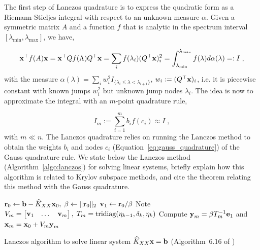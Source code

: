 \documentclass{article}
\begin{document}
The first step of Lanczos quadrature is to express the quadratic form as a Riemann-Stieljes integral with respect to an unknown measure $\alpha$. Given a symmetric matrix $A$ and a function $f$ that is analytic in the spectrum interval $[\lambda_{\min}, \lambda_{\max}]$, we have,

\begin{equation*}
    \boldsymbol{\mathbf{x}}^\top f(A) \boldsymbol{\mathbf{x}} = \boldsymbol{\mathbf{x}}^\top Q f(\Lambda) Q^\top \boldsymbol{\mathbf{x}} = \sum_i f(\lambda_i) (Q^\top \boldsymbol{\mathbf{x}})_i^2 = \int_{\lambda_{\min}}^{\lambda_{\max}} f(\lambda) d \alpha(\lambda) =: I \; ,
\end{equation*}
%
with the measure $\alpha(\lambda) = \sum_i w_i^2 I_{\{\lambda_i \le \lambda < \lambda_{i+1}\}}$, $w_i := (Q^\top \boldsymbol{\mathbf{x}})_i$, i.e. it is piecewise constant with known jumps $w_i^2$ but unknown jump nodes $\lambda_i$. The idea is now to approximate the integral with an $m$-point quadrature rule,

\begin{equation} \label{eq:gauss_quadrature}
    I_m := \sum_{i=1}^m b_i f(c_i) \approx I \; ,
\end{equation}
%
with $m \ll n$. The Lanczos quadrature relies on running the Lanczos method to obtain the weights $b_i$ and nodes $c_i$ (Equation~\eqref{eq:gauss_quadrature}) of the Gauss quadrature rule. We state below the Lanczos method (Algorithm~\ref{algo:lanczos}) for solving linear systems, briefly explain how this algorithm is related to Krylov subspace methods, and cite the theorem relating this method with the Gauss quadrature.

\begin{algorithm}[H]
 \label{algo:lanczos}
\SetAlgoLined
{}
\DontPrintSemicolon
{}
 $\boldsymbol{\mathbf{r}}_0 \leftarrow \boldsymbol{\mathbf{b}} - \widehat K_{XX} \boldsymbol{\mathbf{x}}_0, \; \beta \leftarrow \Vert \boldsymbol{\mathbf{r}}_0 \Vert_2$ \;
 $\boldsymbol{\mathbf{v}}_1 \leftarrow \boldsymbol{\mathbf{r}}_0 / \beta$ \;
 Note $V_m = \begin{bmatrix} \boldsymbol{\mathbf{v}}_1 & \dots & \boldsymbol{\mathbf{v}}_m \end{bmatrix}, \; T_m = \text{tridiag}(\eta_{k-1}, \delta_k, \eta_k)$ \;
 Compute $\boldsymbol{\mathbf{y}}_m = \beta T_m^{-1} \boldsymbol{\mathbf{e}}_1$ and $\boldsymbol{\mathbf{x}}_m = \boldsymbol{\mathbf{x}}_0 + V_m \boldsymbol{\mathbf{y}}_m$ \;
 
 \caption{Lanczos algorithm to solve linear system $\widehat K_{XX} \boldsymbol{\mathbf{x}} = \boldsymbol{\mathbf{b}}$ (Algorithm~6.16 of \cite{saad_iterative_2003})}
\end{algorithm}
\end{document}
